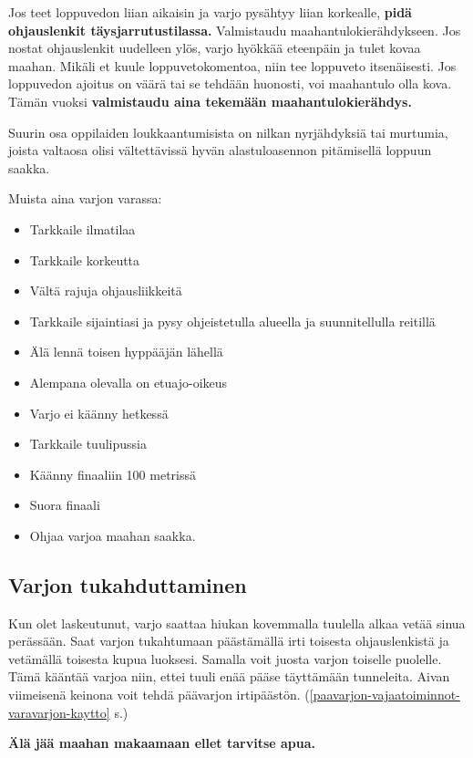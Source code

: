 \begin{multicols}{2}
Jos teet loppuvedon liian aikaisin ja varjo pysähtyy liian korkealle, \textbf{pidä ohjauslenkit täysjarrutustilassa.} Valmistaudu maahantulokierähdykseen. Jos nostat ohjauslenkit uudelleen ylös, varjo hyökkää eteenpäin ja tulet kovaa maahan. Mikäli et kuule loppuvetokomentoa, niin tee loppuveto itsenäisesti. Jos loppuvedon ajoitus on väärä tai se tehdään huonosti, voi maahantulo olla kova. Tämän vuoksi \textbf{valmistaudu aina tekemään maahantulokierähdys.} 


Suurin osa oppilaiden loukkaantumisista on nilkan nyrjähdyksiä tai murtumia, joista valtaosa olisi vältettävissä hyvän alastuloasennon pitämisellä loppuun saakka. 


Muista aina varjon varassa: 

\begin{itemize}
\item  Tarkkaile ilmatilaa 
\item  Tarkkaile korkeutta 
\item  Vältä rajuja ohjausliikkeitä 
\item  Tarkkaile sijaintiasi ja pysy ohjeistetulla alueella ja suunnitellulla reitillä 
\item  Älä lennä toisen hyppääjän lähellä 
\item  Alempana olevalla on etuajo-oikeus 
\item  Varjo ei käänny hetkessä 
\item  Tarkkaile tuulipussia 
\item  Käänny finaaliin 100 metrissä 
\item  Suora finaali 
\item  Ohjaa varjoa maahan saakka. 
\end{itemize}
\subsection{ Varjon tukahduttaminen }
\label{hyppytapahtuma-varjon-tukahduttaminen}


Kun olet laskeutunut, varjo saattaa hiukan kovemmalla tuulella alkaa vetää sinua perässään. Saat varjon tukahtumaan päästämällä irti toisesta ohjauslenkistä ja vetämällä toisesta kupua luoksesi. Samalla voit juosta varjon toiselle puolelle. Tämä kääntää varjoa niin, ettei tuuli enää pääse täyttämään tunneleita. Aivan viimeisenä keinona voit tehdä päävarjon irtipäästön. (\ref{paavarjon-vajaatoiminnot-varavarjon-kaytto} s.\pageref{paavarjon-vajaatoiminnot-varavarjon-kaytto})  


\textbf{Älä jää maahan makaamaan ellet tarvitse apua.} 



\end{multicols}
